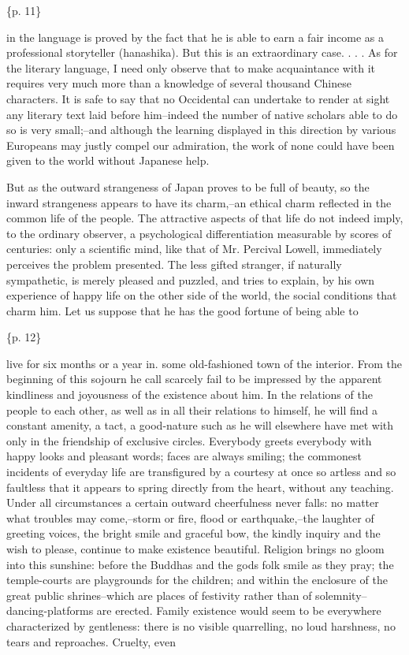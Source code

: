 \{p. 11\}

in the language is proved by the fact that he is able to earn a fair income as a professional storyteller (hanashika). But this is an extraordinary case. . . . As for the literary language, I need only observe that to make acquaintance with it requires very much more than a knowledge of several thousand Chinese characters. It is safe to say that no Occidental can undertake to render at sight any literary text laid before him--indeed the number of native scholars able to do so is very small;--and although the learning displayed in this direction by various Europeans may justly compel our admiration, the work of none could have been given to the world without Japanese help.



But as the outward strangeness of Japan proves to be full of beauty, so the inward strangeness appears to have its charm,--an ethical charm reflected in the common life of the people. The attractive aspects of that life do not indeed imply, to the ordinary observer, a psychological differentiation measurable by scores of centuries: only a scientific mind, like that of Mr. Percival Lowell, immediately perceives the problem presented. The less gifted stranger, if naturally sympathetic, is merely pleased and puzzled, and tries to explain, by his own experience of happy life on the other side of the world, the social conditions that charm him. Let us suppose that he has the good fortune of being able to

\{p. 12\}

live for six months or a year in. some old-fashioned town of the interior. From the beginning of this sojourn he call scarcely fail to be impressed by the apparent kindliness and joyousness of the existence about him. In the relations of the people to each other, as well as in all their relations to himself, he will find a constant amenity, a tact, a good-nature such as he will elsewhere have met with only in the friendship of exclusive circles. Everybody greets everybody with happy looks and pleasant words; faces are always smiling; the commonest incidents of everyday life are transfigured by a courtesy at once so artless and so faultless that it appears to spring directly from the heart, without any teaching. Under all circumstances a certain outward cheerfulness never falls: no matter what troubles may come,--storm or fire, flood or earthquake,--the laughter of greeting voices, the bright smile and graceful bow, the kindly inquiry and the wish to please, continue to make existence beautiful. Religion brings no gloom into this sunshine: before the Buddhas and the gods folk smile as they pray; the temple-courts are playgrounds for the children; and within the enclosure of the great public shrines--which are places of festivity rather than of solemnity--dancing-platforms are erected. Family existence would seem to be everywhere characterized by gentleness: there is no visible quarrelling, no loud harshness, no tears and reproaches. Cruelty, even

